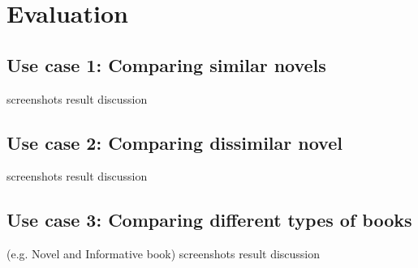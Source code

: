 \chapter{Evaluation}
\label{evaluation}

\section{Use case 1: Comparing similar novels}

screenshots
result
discussion

\section{Use case 2:  Comparing dissimilar novel}

screenshots
result
discussion

\section{Use case 3: Comparing  different types of books}
 (e.g. Novel and Informative book)
screenshots
result
discussion

